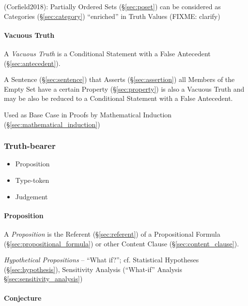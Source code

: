 (Corfield2018): Partially Ordered Sets (\S\ref{sec:poset}) can be considered as
Categories (\S\ref{sec:category}) ``enriched'' in Truth Values (FIXME: clarify)



\paragraph{Vacuous Truth}\label{sec:vacuous_truth}\hfill

A \emph{Vacuous Truth} is a Conditional Statement with a False
Antecedent (\S\ref{sec:antecedent}).

A Sentence (\S\ref{sec:sentence}) that Asserts (\S\ref{sec:assertion})
all Members of the Empty Set have a certain Property
(\S\ref{sec:property}) is also a Vacuous Truth and may be also be
reduced to a Conditional Statement with a False Antecedent.

Used as Base Case in Proofs by Mathematical Induction
(\S\ref{sec:mathematical_induction})



\subsubsection{Truth-bearer}\label{sec:truth_bearer}

\begin{itemize}
  \item Proposition
  \item Type-token
  \item Judgement
\end{itemize}



\paragraph{Proposition}\label{sec:proposition}\hfill

A \emph{Proposition} is the Referent (\S\ref{sec:referent}) of a Propositional
Formula (\S\ref{sec:propositional_formula}) or other Content Clause
(\S\ref{sec:content_clause}).

\emph{Hypothetical Propositions} -- ``What if?''; cf. Statistical Hypotheses
(\S\ref{sec:hypothesis}), Sensitivity Analysis (``What-if'' Analysis
\S\ref{sec:sensitivity_analysis})



\paragraph{Conjecture}\label{sec:conjecture}\hfill

